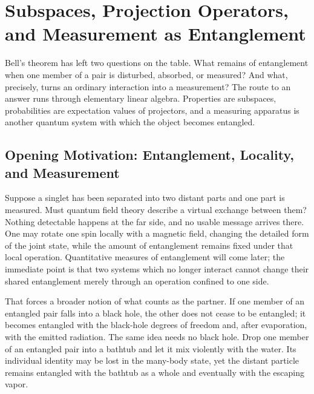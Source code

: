 \chapter{Subspaces, Projection Operators, and Measurement as Entanglement}

Bell's theorem has left two questions on the table. What remains of entanglement when one member of a pair is disturbed, absorbed, or measured? And what, precisely, turns an ordinary interaction into a measurement? The route to an answer runs through elementary linear algebra. Properties are subspaces, probabilities are expectation values of projectors, and a measuring apparatus is another quantum system with which the object becomes entangled.

\section{Opening Motivation: Entanglement, Locality, and Measurement}

Suppose a singlet has been separated into two distant parts and one part is measured. Must quantum field theory describe a virtual exchange between them? Nothing detectable happens at the far side, and no usable message arrives there. One may rotate one spin locally with a magnetic field, changing the detailed form of the joint state, while the amount of entanglement remains fixed under that local operation. Quantitative measures of entanglement will come later; the immediate point is that two systems which no longer interact cannot change their shared entanglement merely through an operation confined to one side.

\begin{classroomqa}
\end{classroomqa}

That forces a broader notion of what counts as the partner. If one member of an entangled pair falls into a black hole, the other does not cease to be entangled; it becomes entangled with the black-hole degrees of freedom and, after evaporation, with the emitted radiation. The same idea needs no black hole. Drop one member of an entangled pair into a bathtub and let it mix violently with the water. Its individual identity may be lost in the many-body state, yet the distant particle remains entangled with the bathtub as a whole and eventually with the escaping vapor.

